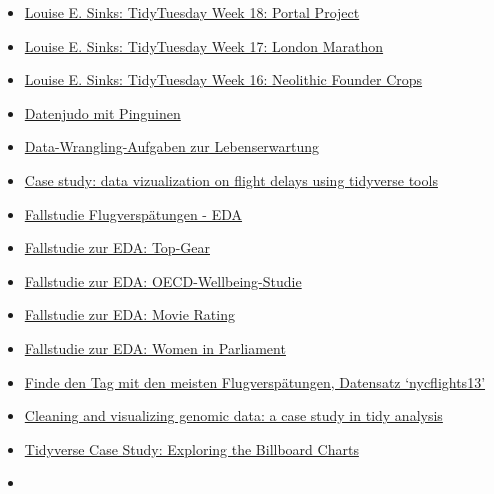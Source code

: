 \documentclass[
  a4paper,
]{scrbook}
\theoremstyle{definition}
\theoremstyle{definition}
\theoremstyle{definition}
\theoremstyle{remark}
\begin{document}
\begin{itemize}
\item
  \href{https://lsinks.github.io/posts/2023-05-02-portal-project/portal.html}{Louise
  E. Sinks: TidyTuesday Week 18: Portal Project}
\item
  \href{https://lsinks.github.io/posts/2023-04-25-tidytuesday-marathon/marathon.html}{Louise
  E. Sinks: TidyTuesday Week 17: London Marathon}
\item
  \href{https://lsinks.github.io/posts/2023-04-18-tidytuesday-founder-crops/founder-crops.html}{Louise
  E. Sinks: TidyTuesday Week 16: Neolithic Founder Crops}
\item
  \href{https://allisonhorst.shinyapps.io/dplyr-learnr/\#section-welcome}{Datenjudo
  mit Pinguinen}
\item
  \href{https://data-se.netlify.app/2021/02/24/exercises-to-data-wrangling-with-the-tidyverse/}{Data-Wrangling-Aufgaben
  zur Lebenserwartung}
\item
  \href{https://data-se.netlify.app/2021/02/24/case-study-data-vizualization-on-flight-delays-using-tidyverse-tools/}{Case
  study: data vizualization on flight delays using tidyverse tools}
\item
  \href{https://data-se.netlify.app/2021/03/08/eda-zu-flugversp\%C3\%A4tungen/}{Fallstudie
  Flugverspätungen - EDA}
\item
  \href{https://data-se.netlify.app/2021/02/11/yacda-topgear/}{Fallstudie
  zur EDA: Top-Gear}
\item
  \href{https://data-se.netlify.app/2021/02/11/explorative-datenanalyse-zum-datensatz-oecd-wellbeing/}{Fallstudie
  zur EDA: OECD-Wellbeing-Studie}
\item
  \href{https://minimaxir.com/2018/07/imdb-data-analysis/}{Fallstudie
  zur EDA: Movie Rating}
\item
  \href{https://github.com/saghirb/WiP-tidyverse/blob/master/doc/WiP-tidyverse.pdf}{Fallstudie
  zur EDA: Women in Parliament}
\item
  \href{https://data-se.netlify.app/2021/05/27/datensatz-flights-finde-den-tag-mit-den-meisten-abfl\%C3\%BCgen/}{Finde
  den Tag mit den meisten Flugverspätungen, Datensatz `nycflights13'}
\item
  \href{http://varianceexplained.org/r/tidy-genomics/}{Cleaning and
  visualizing genomic data: a case study in tidy analysis}
\item
  \href{https://www.njtierney.com/post/2017/11/07/tidyverse-billboard/}{Tidyverse
  Case Study: Exploring the Billboard Charts}
\item

\end{itemize}
\end{document}
